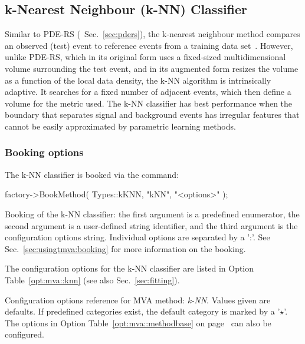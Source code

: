 \subsection{k-Nearest Neighbour (k-NN) Classifier}
\label{sec:knn}

Similar to PDE-RS (\cf\  Sec.~\ref{sec:pders}), the k-nearest neighbour method compares 
an observed (test) event to reference events from a training data set~\cite{FriedmanBook}. 
However, unlike PDE-RS, which in its original form uses a fixed-sized multidimensional volume 
surrounding the test event, and in its augmented form resizes the volume as a function of 
the local data density, the k-NN algorithm is intrinsically adaptive. It searches for a 
fixed number of adjacent events, which then define a volume for the metric used. The k-NN 
classifier has best performance when the boundary that separates signal and background 
events has irregular features that cannot be easily approximated by parametric learning 
methods. 

\subsubsection{Booking options}

The k-NN classifier is booked via the command:
\begin{codeexample}
\begin{tmvacode}
factory->BookMethod( Types::kKNN, "kNN", "<options>" );
\end{tmvacode}
\caption[.]{\codeexampleCaptionSize Booking of the k-NN classifier: the first argument is 
		   a predefined enumerator, the second argument is a user-defined 
		   string identifier, and the third argument is the configuration options string.
         Individual options are separated by a ':'. 
         See Sec.~\ref{sec:usingtmva:booking} for more information on the booking.}
\end{codeexample}

The configuration options for the k-NN classifier are listed in Option Table~\ref{opt:mva::knn}
(see also Sec.~\ref{sec:fitting}).

\begin{option}[t]

\caption[.]{\optionCaptionSize 
     Configuration options reference for MVA method: {\em k-NN}.
     Values given are defaults. If predefined categories exist, the default category 
     is marked by a '$\star$'. The options in Option Table~\ref{opt:mva::methodbase} on 
     page~\pageref{opt:mva::methodbase} can also be configured.     
}
\label{opt:mva::knn}
\end{option}

